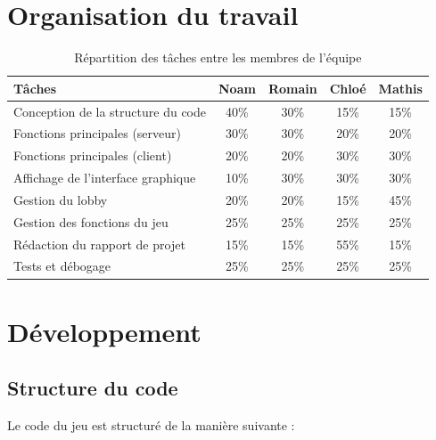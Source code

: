 \documentclass[12pt,a4paper]{article}
\begin{document}
    \section{Organisation du travail}
        \renewcommand{\arraystretch}{1.3}
        \setlength{\tabcolsep}{8pt}
        \begin{table}[h]
        \centering
        \begin{tabularx}{\textwidth}{|>{\raggedright\arraybackslash}X|c|c|c|c|}
        \hline
        \textbf{Tâches} & \textbf{Noam} & \textbf{Romain} & \textbf{Chloé} & \textbf{Mathis} \\
        \hline
        Conception de la structure du code & 40\% & 30\% & 15\% & 15\% \\
        \hline
        Fonctions principales (serveur) & 30\% & 30\% & 20\% & 20\% \\
        \hline
        Fonctions principales (client) & 20\% & 20\% & 30\% & 30\% \\
        \hline
        Affichage de l'interface graphique & 10\% & 30\% & 30\% & 30\% \\
        \hline
        Gestion du lobby & 20\% & 20\% & 15\% & 45\% \\
        \hline
        Gestion des fonctions du jeu & 25\% & 25\% & 25\% & 25\% \\
        \hline
        Rédaction du rapport de projet & 15\% & 15\% & 55\% & 15\% \\
        \hline
        Tests et débogage & 25\% & 25\% & 25\% & 25\% \\
        \hline
        \end{tabularx}
        \caption{Répartition des tâches entre les membres de l'équipe}
        \end{table}

    \newpage
    \section{Développement}

        \subsection{Structure du code}

        Le code du jeu est structuré de la manière suivante :
\end{document}
